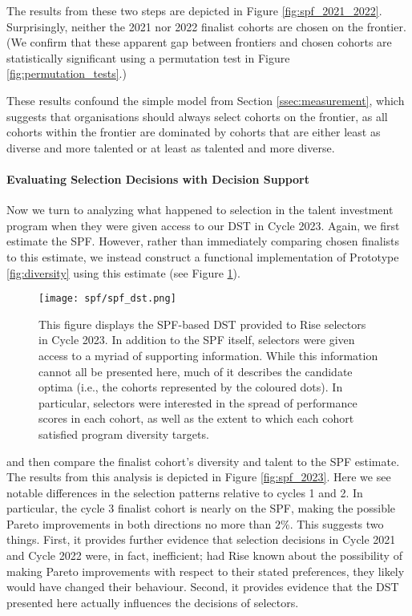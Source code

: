The results from these two steps are depicted in Figure \ref{fig:spf_2021_2022}. Surprisingly, neither the 2021 nor 2022 finalist cohorts are chosen on the frontier. (We confirm that these apparent gap between frontiers and chosen cohorts are statistically significant using a permutation test in Figure \ref{fig:permutation_tests}.)

These results confound the simple model from Section \ref{ssec:measurement}, which suggests that organisations should always select cohorts on the frontier, as all cohorts within the frontier are dominated by cohorts that are either least as diverse and more talented or at least as talented and more diverse.

\paragraph{Evaluating Selection Decisions with Decision Support}
Now we turn to analyzing what happened to selection in the talent investment program when they were given access to our DST in Cycle 2023. Again, we first estimate the SPF. However, rather than immediately comparing chosen finalists to this estimate, we instead construct a functional implementation of Prototype \ref{fig:diversity} using this estimate (see Figure \ref{fig:spf_dst}).

\begin{figure}[htbp]
    \centering
    \caption{This figure displays the SPF-based DST provided to Rise selectors in Cycle 2023. In addition to the SPF itself, selectors were given access to a myriad of supporting information. While this information cannot all be presented here, much of it describes the candidate optima (i.e., the cohorts represented by the coloured dots). In particular, selectors were interested in the spread of performance scores in each cohort, as well as the extent to which each cohort satisfied program diversity targets.}
    \label{fig:spf_dst}
    \texttt{[image: spf/spf\_dst.png]} 
\end{figure}

and then compare the finalist cohort's diversity and talent to the SPF estimate. The results from this analysis is depicted in Figure \ref{fig:spf_2023}. Here we see notable differences in the selection patterns relative to cycles 1 and 2. In particular, the cycle 3 finalist cohort is nearly on the SPF, making the possible Pareto improvements in both directions no more than $2\%$. This suggests two things. First, it provides further evidence that selection decisions in Cycle 2021 and Cycle 2022 were, in fact, inefficient; had Rise known about the possibility of making Pareto improvements with respect to their stated preferences, they likely would have changed their behaviour. Second, it provides evidence that the DST presented here actually influences the decisions of selectors. 

